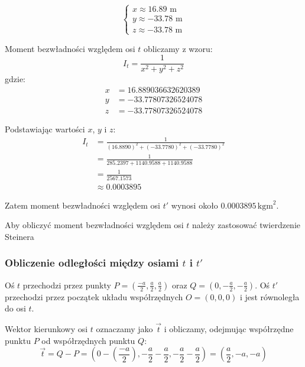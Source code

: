 \documentclass[a4paper,12pt]{article}
\begin{document}


\begin{equation*}
    \begin{cases}
        x \approx 16.89\text{ m}  \\
        y \approx -33.78\text{ m} \\
        z \approx -33.78\text{ m}
    \end{cases}
\end{equation*}



Moment bezwładności względem osi $t$ obliczamy z wzoru:
\[
    I_t = \frac{1}{x^2 + y^2 + z^2}
\]
gdzie:
\begin{align*}
    x & = 16.889036632620389 \\
    y & = -33.77807326524078 \\
    z & = -33.77807326524078
\end{align*}

Podstawiając wartości $x$, $y$ i $z$:
\begin{align*}
    I_t & = \frac{1}{(16.8890)^2 + (-33.7780)^2 + (-33.7780)^2} \\
        & = \frac{1}{285.2397 + 1140.9588 + 1140.9588}          \\
        & = \frac{1}{2567.1573}                                 \\
        & \approx 0.0003895
\end{align*}

Zatem moment bezwładności względem osi $t'$ wynosi około $0.0003895\,\text{kgm}^2$.\par
Aby obliczyć moment bezwładności względem osi $t$ należy zastosować twierdzenie Steinera\par
\subsubsection*{Obliczenie odległości między osiami $t$ i $t'$}

Oś $t$ przechodzi przez punkty $P = \left(\frac{-a}{2}, \frac{a}{2}, \frac{a}{2}\right)$ oraz $Q = \left(0, -\frac{a}{2}, -\frac{a}{2}\right)$.
Oś $t'$ przechodzi przez początek układu współrzędnych $O = (0, 0, 0)$ i jest równoległa do osi $t$.

Wektor kierunkowy osi $t$ oznaczamy jako $\vec{t}$ i obliczamy, odejmując współrzędne punktu $P$ od współrzędnych punktu $Q$:
\[
    \vec{t} = Q - P = \left(0 - \left(\frac{-a}{2}\right), -\frac{a}{2} - \frac{a}{2}, -\frac{a}{2} - \frac{a}{2}\right) = \left(\frac{a}{2}, -a, -a\right)
\]
\end{document}
